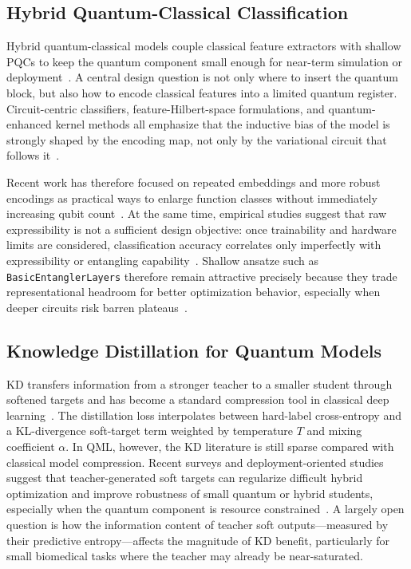 \documentclass[11pt,a4paper]{article}
\begin{document}
\subsection{Hybrid Quantum-Classical Classification}
Hybrid quantum-classical models couple classical feature extractors with shallow PQCs to keep the
quantum component small enough for near-term simulation or
deployment~\cite{preskill2018nisq,benedetti2019pqc,cerezo2021vqa}. A central design question is not
only where to insert the quantum block, but also how to encode classical features into a limited
quantum register. Circuit-centric classifiers, feature-Hilbert-space formulations, and
quantum-enhanced kernel methods all emphasize that the inductive bias of the model is strongly shaped
by the encoding map, not only by the variational circuit that follows
it~\cite{schuld2020circuit,schuld2019feature,havlicek2019feature}.

Recent work has therefore focused on repeated embeddings and more robust encodings as practical ways
to enlarge function classes without immediately increasing qubit
count~\cite{perezsalinas2020reuploading,schuld2021encoding,larose2020robust}. At the same time,
empirical studies suggest that raw expressibility is not a sufficient design objective: once
trainability and hardware limits are considered, classification accuracy correlates only imperfectly
with expressibility or entangling capability~\cite{hubregtsen2021evaluation,abbas2021power,peters2021highdim}.
Shallow ansatze such as \texttt{BasicEntanglerLayers} therefore remain attractive precisely because
they trade representational headroom for better optimization behavior, especially when deeper
circuits risk barren plateaus~\cite{mcclean2018barren,cerezo2021cost,holmes2022expressibility}.

\subsection{Knowledge Distillation for Quantum Models}
KD transfers information from a stronger teacher to a smaller student through softened targets and has
become a standard compression tool in classical deep learning~\cite{kd}. The distillation loss
interpolates between hard-label cross-entropy and a KL-divergence soft-target term weighted by
temperature $T$ and mixing coefficient $\alpha$. In QML, however, the KD literature is still sparse
compared with classical model compression. Recent surveys and deployment-oriented studies suggest that
teacher-generated soft targets can regularize difficult hybrid optimization and improve robustness of
small quantum or hybrid students, especially when the quantum component is resource
constrained~\cite{chen2024quantumkd,hur2025quantumknowledge}. A largely open question is how the
information content of teacher soft outputs---measured by their predictive entropy---affects the
magnitude of KD benefit, particularly for small biomedical tasks where the teacher may already be
near-saturated.
\end{document}
